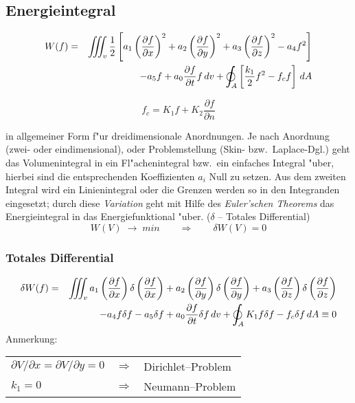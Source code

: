 \subsection{Energieintegral}
\begin{eqnarray*}
W(f)&=&\IIINT_v \frac{1}{2}\left[a_1\left(\frac{\partial
f}{\partial x}\right)^2+a_2\left(\frac{\partial f}{\partial y}\right)^2+
a_3\left(\frac{\partial f}{\partial z}\right)^2
-a_4f^2\right]\\&&-a_5f+a_0\frac{\partial f}{\partial t}f\,
dv+\OIINT_A \left[\frac{k_1}{2}f^2-f_cf\right]\,dA
\end{eqnarray*}

$$f_c=K_1f+K_2\frac{\partial f}{\partial n}$$

in allgemeiner Form f"ur dreidimensionale Anordnungen. Je nach Anordnung
(zwei- oder eindimensional), oder Problemstellung (Skin- bzw.\ Laplace-Dgl.)
geht das
Volumenintegral in ein Fl"achenintegral bzw.\ ein einfaches Integral "uber,
hierbei sind die entsprechenden Koeffizienten $a_i$ Null zu setzen. Aus
dem zweiten Integral wird ein Linienintegral oder die Grenzen werden so in den
Integranden eingesetzt; durch diese {\sl Variation}  geht
mit Hilfe des {\sl Euler'schen Theorems} das Energieintegral in das
Energiefunktional "uber. ($\delta$ -- Totales Differential)
$$W(V)\;\rightarrow\; min \qquad\Rightarrow\qquad \delta W(V)=0$$

\subsubsection{Totales Differential}
\begin{eqnarray*}
\delta W(f)&=&\IIINT_v a_1\left(\frac{\partial
f}{\partial x}\right)\delta\left(\frac{\partial f}{\partial x}\right)+a_2
\left(\frac{\partial f}{\partial y}\right)\delta\left(\frac{\partial f}{\partial
y}\right)+
a_3\left(\frac{\partial f}{\partial
z}\right)\delta\left(\frac{\partial f}{\partial z}\right)\\&&-a_4f\delta
f-a_5\delta f+a_0\frac{\partial f}{\partial t}\delta f\,
dv+\OIINT_A K_1f\delta f-f_c\delta f \, dA
\equiv 0
\end{eqnarray*}
Anmerkung:

\begin{tabular}{lll}
  $\partial V/\partial x = \partial V/\partial y=0$ & $\Rightarrow$ &
  Dirichlet--Problem\\ $k_1=0$ & $\Rightarrow$ & Neumann--Problem \\
\end{tabular}

